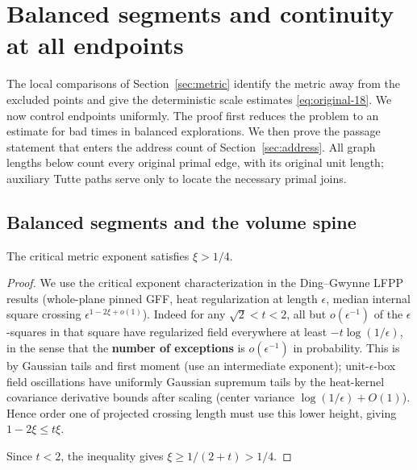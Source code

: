 \section{Balanced segments and continuity at all endpoints}\label{sec:endpoints}
The local comparisons of Section~\ref{sec:metric} identify the metric away from the
excluded points and give the deterministic scale estimates
\eqref{eq:original-18}. We now control endpoints uniformly. The proof first reduces
the problem to an estimate for bad times in balanced explorations. We then prove
the passage statement that enters the address count of Section~\ref{sec:address}.
All graph lengths below count every original primal edge, with its original unit
length; auxiliary Tutte paths serve only to locate the necessary primal joins.

\subsection{Balanced segments and the volume spine}

\begin{lemma}\label{end:exponent}
The critical metric exponent satisfies $\xi>1/4$.
\end{lemma}

\begin{proof}

We use the critical exponent characterization in the Ding--Gwynne LFPP results
\cite[Section~1.2, Equations~(1.4)--(1.7)]{DGuniqueness} (whole-plane pinned GFF, heat regularization at length \(\epsilon\),
median internal square crossing \(\epsilon^{1-2\xi+o(1)}\)). Indeed for any
\(\sqrt2<t<2\), all but \(o(\epsilon^{-1})\) of the \(\epsilon\)-squares in that square
have regularized field everywhere at least \(-t\log(1/\epsilon)\), in the sense that the
\textbf{number of exceptions} is \(o(\epsilon^{-1})\) in probability. This is by Gaussian
tails and first moment (use an intermediate exponent); unit-\(\epsilon\)-box field
oscillations have uniformly Gaussian supremum tails by the heat-kernel covariance
derivative bounds after scaling (center variance \(\log(1/\epsilon)+O(1)\)). Hence order
one of projected crossing length must use this lower height, giving \(1-2\xi\le t\xi\).

Since $t<2$, the inequality gives $\xi\ge 1/(2+t)>1/4$.

\end{proof}

